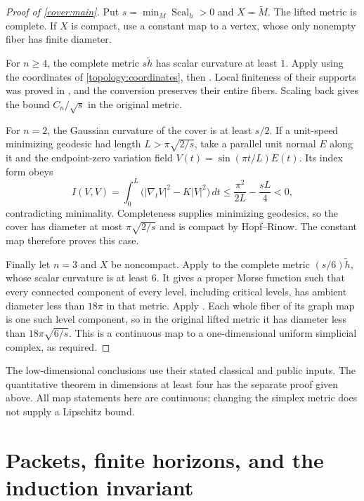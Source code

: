 \documentclass[11pt]{article}
\numberwithin{equation}{section}
\theoremstyle{definition}
\theoremstyle{remark}
\begin{document}
\begin{proof}[Proof of \cref{cover:main}]
Put $s=\min_M\operatorname{Scal}_h>0$ and $X=\widetilde M$.  The lifted metric
is complete.  If $X$ is compact, use a constant map to a vertex,
whose only nonempty fiber has finite diameter.

For $n\ge4$, the complete metric $s\widetilde h$ has scalar
curvature at least $1$.  Apply  using the coordinates
of \eqref{topology:coordinates}, then .  Local
finiteness of their supports was proved in
, and the conversion preserves their
entire fibers.  Scaling back gives the bound $C_n/\sqrt{s}$ in
the original metric.

For $n=2$, the Gaussian curvature of the cover is at least $s/2$.
If a unit-speed minimizing geodesic had length $L>\pi\sqrt{2/s}$,
take a parallel unit normal $E$ along it and the endpoint-zero
variation field $V(t)=\sin(\pi t/L)E(t)$.  Its index form obeys
\[
 I(V,V)=\int_0^L\bigl(|\nabla_tV|^2-K|V|^2\bigr)\,dt
 \le \frac{\pi^2}{2L}-\frac{sL}{4}<0,
\]
contradicting minimality.  Completeness supplies minimizing geodesics,
so the cover has diameter at most $\pi\sqrt{2/s}$ and is compact
by Hopf--Rinow.  The constant map therefore proves this case.

Finally let $n=3$ and $X$ be noncompact.  Apply
\citet[Theorem~1.1, arXiv version~1]{liokumovichWang2023} to the
complete metric $(s/6)\widetilde h$, whose scalar curvature is at
least $6$.  It gives a proper Morse function such that every
connected component of every level, including critical levels, has
ambient diameter less than $18\pi$ in that metric.  Apply
.  Each whole fiber of its graph map is one such
level component, so in the original lifted metric it has diameter
less than $18\pi\sqrt{6/s}$.  This is a continuous map to a
one-dimensional uniform simplicial complex, as required.
\end{proof}

The low-dimensional conclusions use their stated classical and public
inputs.  The quantitative theorem in dimensions at least four has
the separate proof given above.  All map statements here are continuous;
changing the simplex metric does not supply a Lipschitz bound.

\appendix
\section{Packets, finite horizons, and the induction invariant}\label{sec:packets}
\end{document}
